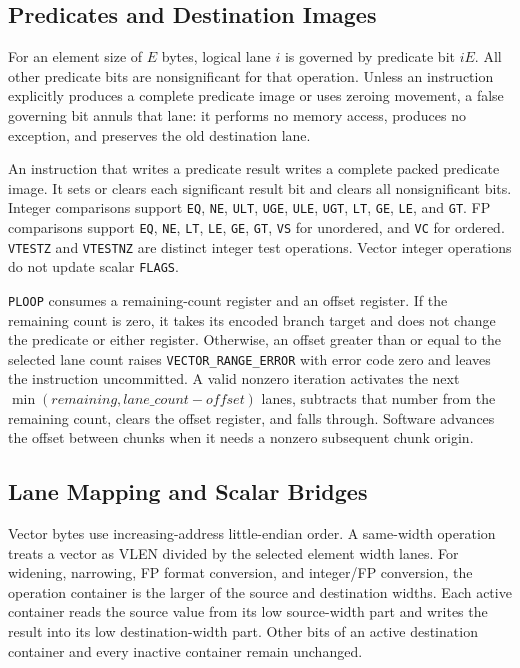 \subsection{Predicates and Destination Images}

For an element size of $E$ bytes, logical lane $i$ is governed by predicate
bit $iE$.  All other predicate bits are nonsignificant for that operation.
Unless an instruction explicitly produces a complete predicate image or uses
zeroing movement, a false governing bit annuls that lane: it performs no
memory access, produces no exception, and preserves the old destination lane.

An instruction that writes a predicate result writes a complete packed
predicate image.  It sets or clears each significant result bit and clears
all nonsignificant bits.  Integer comparisons support \texttt{EQ},
\texttt{NE}, \texttt{ULT}, \texttt{UGE}, \texttt{ULE}, \texttt{UGT},
\texttt{LT}, \texttt{GE}, \texttt{LE}, and \texttt{GT}.  FP comparisons
support \texttt{EQ}, \texttt{NE}, \texttt{LT}, \texttt{LE}, \texttt{GE},
\texttt{GT}, \texttt{VS} for unordered, and \texttt{VC} for ordered.
\texttt{VTESTZ} and \texttt{VTESTNZ} are distinct integer test operations.
Vector integer operations do not update scalar \texttt{FLAGS}.

\texttt{PLOOP} consumes a remaining-count register and an offset register.  If
the remaining count is zero, it takes its encoded branch target and does not
change the predicate or either register.  Otherwise, an offset greater than
or equal to the selected lane count raises \texttt{VECTOR\_RANGE\_ERROR} with
error code zero and leaves the instruction uncommitted.  A valid nonzero
iteration activates the next
$\min(remaining, lane\_count-offset)$ lanes, subtracts that number from the
remaining count, clears the offset register, and falls through.  Software
advances the offset between chunks when it needs a nonzero subsequent chunk
origin.

\subsection{Lane Mapping and Scalar Bridges}

Vector bytes use increasing-address little-endian order.  A same-width
operation treats a vector as VLEN divided by the selected element width lanes.
For widening, narrowing, FP format conversion, and integer/FP conversion, the
operation container is the larger of the source and destination widths.  Each
active container reads the source value from its low source-width part and
writes the result into its low destination-width part.  Other bits of an
active destination container and every inactive container remain unchanged.

